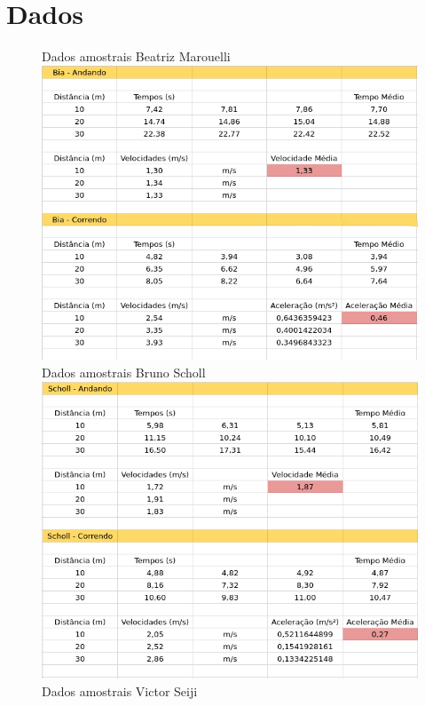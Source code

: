 \documentclass[a4paper, 12pt]{article}
\begin{document}
\section*{Dados}
    \begin{figure}
    \centering
    Dados amostrais Beatriz Marouelli
    \includegraphics[scale=0.45]{Bia.png}
    \\ Dados amostrais Bruno Scholl
    \includegraphics[scale=0.45]{Scholl.png}
    \\ Dados amostrais Victor Seiji 
    \end{figure}
\end{document}
